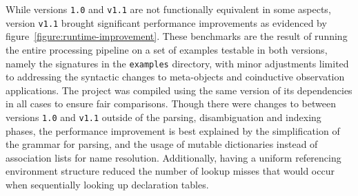 While \Beluga versions \texttt{1.0} and \texttt{v1.1} are not functionally equivalent in some aspects, version \texttt{v1.1} brought significant performance improvements as evidenced by figure~\ref{figure:runtime-improvement}.
These benchmarks are the result of running the entire processing pipeline on a set of examples testable in both versions, namely the \Beluga signatures in the \texttt{examples} directory, with minor adjustments limited to addressing the syntactic changes to meta-objects and coinductive observation applications.
The project was compiled using the same version of its dependencies in all cases to ensure fair comparisons.
Though there were changes to \Beluga between versions \texttt{1.0} and \texttt{v1.1} outside of the parsing, disambiguation and indexing phases, the performance improvement is best explained by the simplification of the grammar for parsing, and the usage of mutable dictionaries instead of association lists for name resolution.
Additionally, having a uniform referencing environment structure reduced the number of lookup misses that would occur when sequentially looking up declaration tables.








